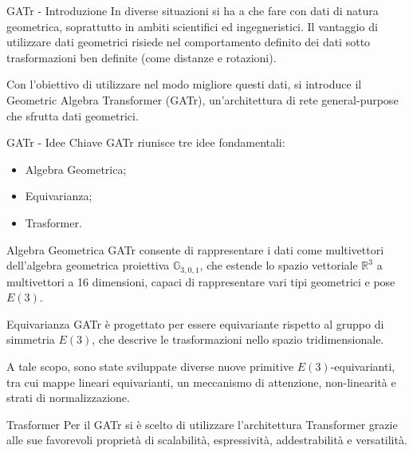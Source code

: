 \begin{frame}{GATr - Introduzione}
    In diverse situazioni si ha a che fare con dati di natura geometrica, soprattutto
    in ambiti scientifici ed ingegneristici. Il vantaggio di utilizzare dati geometrici
    risiede nel comportamento definito dei dati sotto trasformazioni ben definite 
    (come distanze e rotazioni).

    Con l'obiettivo di utilizzare nel modo migliore questi dati, si introduce il 
    Geometric Algebra Transformer (GATr), un'architettura di rete general-purpose 
    che sfrutta dati geometrici. 
\end{frame}

\begin{frame}{GATr - Idee Chiave}
    GATr riunisce tre idee fondamentali: 
    \begin{itemize}
        \item Algebra Geometrica;
        \item Equivarianza;
        \item Trasformer.
    \end{itemize}
\end{frame}

\begin{frame}{Algebra Geometrica}
    GATr consente di rappresentare i dati come multivettori dell'algebra geometrica 
    proiettiva \(\mathbb{G}_{3,0,1}\), che estende lo spazio vettoriale 
    \(\mathbb{R}^{3}\) a multivettori a 16 dimensioni, capaci di rappresentare vari 
    tipi geometrici e pose \(E(3)\).
\end{frame}

\begin{frame}{Equivarianza}
    GATr è progettato per essere equivariante rispetto al gruppo di simmetria \(E(3)\), 
    che descrive le trasformazioni nello spazio tridimensionale. 

    A tale scopo, sono state sviluppate diverse nuove primitive 
    \(E(3)\)-equivarianti, tra cui mappe lineari equivarianti, un meccanismo di 
    attenzione, non-linearità e strati di normalizzazione.
\end{frame}

\begin{frame}{Trasformer}
    Per il GATr si è scelto di utilizzare l'architettura Transformer grazie alle sue 
    favorevoli proprietà di scalabilità, espressività, addestrabilità e versatilità.
\end{frame}
